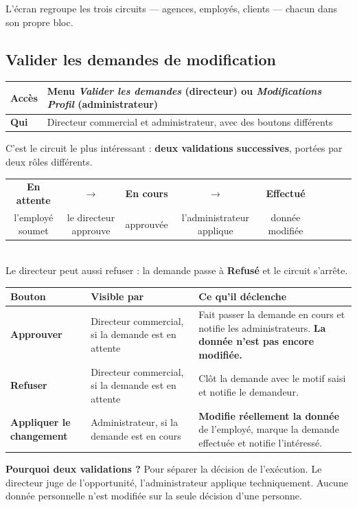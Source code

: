 \documentclass[a4paper,11pt]{article}
\newcommand{\ecran}[3]{%
  \subsection{#1}%
  \noindent\begin{tabularx}{\textwidth}{|>{\columncolor{btkpale}\bfseries}L{2.3cm}|X|}
  \hline
  \textbf{Accès} & #2\\
  \hline
  \textbf{Qui} & #3\\
  \hline
  \end{tabularx}\par\vspace{0.4em}}
\begin{document}
\vspace{0.4em}
L'écran regroupe les trois circuits --- agences, employés, clients --- chacun
dans son propre bloc.

\ecran{Valider les demandes de modification}{Menu \emph{Valider les demandes} (directeur) ou \emph{Modifications Profil} (administrateur)}{Directeur commercial et administrateur, avec des boutons différents}

C'est le circuit le plus intéressant : \textbf{deux validations successives},
portées par deux rôles différents.

\begin{center}
\small
\begin{tabular}{ccccccccc}
\colorbox{btkpale}{\textbf{En attente}} & $\rightarrow$ &
\colorbox{btkpale}{\textbf{En cours}} & $\rightarrow$ &
\colorbox{btkpale}{\textbf{Effectué}} \\[3pt]
\footnotesize l'employé soumet & \footnotesize le directeur approuve &
\footnotesize approuvée & \footnotesize l'administrateur applique &
\footnotesize donnée modifiée
\end{tabular}\\[5pt]
\footnotesize Le directeur peut aussi refuser : la demande passe à \textbf{Refusé} et le circuit s'arrête.
\end{center}

\noindent\begin{tabularx}{\textwidth}{|>{\bfseries}L{3.5cm}|L{2.4cm}|X|}
\hline
\textmd{\textbf{Bouton}} & \textbf{Visible par} & \textbf{Ce qu'il déclenche}\\
\hline
Approuver & Directeur commercial, si la demande est en attente & Fait passer la demande en cours et notifie les administrateurs. \textbf{La donnée n'est pas encore modifiée.}\\
\hline
Refuser & Directeur commercial, si la demande est en attente & Clôt la demande avec le motif saisi et notifie le demandeur.\\
\hline
Appliquer le changement & Administrateur, si la demande est en cours & \textbf{Modifie réellement la donnée} de l'employé, marque la demande effectuée et notifie l'intéressé.\\
\hline
\end{tabularx}

\begin{retenir}
\textbf{Pourquoi deux validations ?} Pour séparer la décision de l'exécution. Le
directeur juge de l'opportunité, l'administrateur applique techniquement.
Aucune donnée personnelle n'est modifiée sur la seule décision d'une personne.
\end{retenir}
\end{document}
